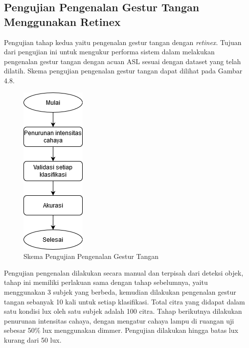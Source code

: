 \subsection{Pengujian Pengenalan Gestur Tangan Menggunakan Retinex}
Pengujian tahap kedua yaitu pengenalan gestur tangan dengan \emph{retinex}. Tujuan dari pengujian ini untuk mengukur performa sistem dalam melakukan pengenalan gestur tangan dengan acuan ASL sesuai dengan dataset yang telah dilatih. Skema pengujian pengenalan gestur tangan dapat dilihat pada Gambar 4.8.
\begin{figure}[H]
	\centering
	\includegraphics[width=0.19\linewidth]{"proses pengujian sistem"}
	\caption{Skema Pengujian Pengenalan Gestur Tangan}
	\label{fig:screenshot-from-2020-03-04-22-24-45}
\end{figure}
Pengujian pengenalan dilakukan secara manual dan terpisah dari deteksi objek, tahap ini memiliki perlakuan sama dengan tahap sebelumnya, yaitu menggunakan 3 subjek yang berbeda, kemudian dilakukan pengenalan gestur tangan sebanyak 10 kali untuk setiap klasifikasi. Total citra yang didapat dalam satu kondisi lux oleh satu subjek adalah 100 citra.
Tahap berikutnya dilakukan penurunan intensitas cahaya, dengan mengatur cahaya lampu di ruangan uji sebesar 50\% lux menggunakan dimmer. Pengujian dilakukan hingga batas lux kurang dari 50 lux.
